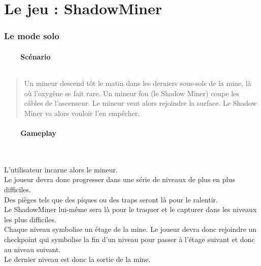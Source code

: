 \documentclass[titlepage, 13px, a4paper]{report}
\begin{document}
\newpage


\part{Le jeu : ShadowMiner}
\section{Le mode solo}

\subsection[Scénario]{~~~~Scénario}
\paragraph{} \hspace{0pt}
\begin{quotation}
	Un mineur descend tôt le matin dans les derniers sous-sols de la mine, là où l’oxygène se fait rare. 
	Un mineur fou (le Shadow Miner) coupe les câbles de l’ascenseur. 
	Le mineur veut alors rejoindre la surface. Le Shadow Miner va alors vouloir l’en empêcher. \\
\end{quotation}

\subsection[Gameplay]{~~~~Gameplay}
\paragraph{} \hspace{0pt} \\
L’utilisateur incarne alors le mineur. \\
Le joueur devra donc progresser dans une série de niveaux de plus en plus difficiles. \\
Des pièges tels que des piques ou des traps seront là pour le ralentir. \\
Le ShadowMiner lui-même sera là pour le traquer et le capturer dans les niveaux les plus difficiles. \\
Chaque niveau symbolise un étage de la mine. Le joueur devra donc rejoindre un checkpoint 
qui symbolise la fin d’un niveau pour passer à l’étage suivant et donc au niveau suivant. \\
Le dernier niveau est donc la sortie de la mine. \\ 
\end{document}
